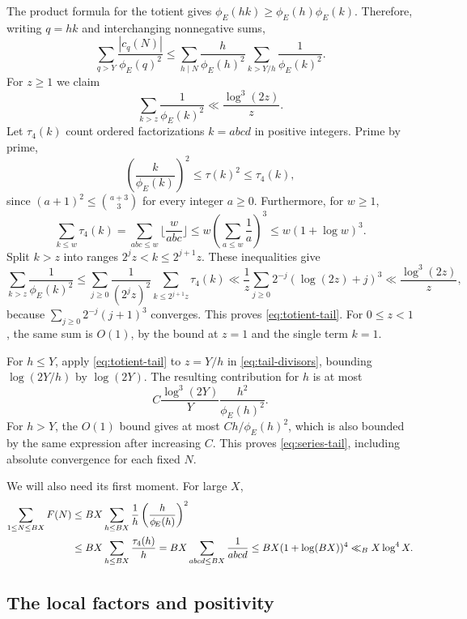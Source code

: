 \documentclass[11pt,letterpaper]{article}
\numberwithin{equation}{section}
\theoremstyle{remark}
\newcommand{\tot}{\phi_{\!E}}
\newcommand{\floor}[1]{\lfloor #1\rfloor}
\begin{document}
The product formula for the totient gives
$\tot(hk)\ge\tot(h)\tot(k)$. Therefore, writing $q=hk$ and
interchanging nonnegative sums,
\begin{equation}\label{eq:tail-divisors}
 \sum_{q>Y}\frac{|c_q(N)|}{\tot(q)^2}
 \le\sum_{h\mid N}\frac{h}{\tot(h)^2}
             \sum_{k>Y/h}\frac1{\tot(k)^2}.
\end{equation}
For $z\ge1$ we claim
\begin{equation}\label{eq:totient-tail}
 \sum_{k>z}\frac1{\tot(k)^2}\ll\frac{\log^3(2z)}z.
\end{equation}
Let $\tau_4(k)$ count ordered factorizations $k=abcd$ in positive
integers. Prime by prime,
\[
 \left(\frac{k}{\tot(k)}\right)^2\le\tau(k)^2\le\tau_4(k),
\]
since $(a+1)^2\le\binom{a+3}{3}$ for every integer $a\ge0$.
Furthermore, for $w\ge1$,
\[
 \sum_{k\le w}\tau_4(k)
 =\sum_{abc\le w}\floor{\frac{w}{abc}}
 \le w\left(\sum_{a\le w}\frac1a\right)^3
 \le w(1+\log w)^3.
\]
Split $k>z$ into ranges $2^jz<k\le2^{j+1}z$. These inequalities give
\[
 \sum_{k>z}\frac1{\tot(k)^2}
 \le\sum_{j\ge0}\frac1{(2^jz)^2}
                    \sum_{k\le2^{j+1}z}\tau_4(k)
 \ll\frac1z\sum_{j\ge0}2^{-j}(\log(2z)+j)^3
 \ll\frac{\log^3(2z)}z,
\]
because $\sum_{j\ge0}2^{-j}(j+1)^3$ converges. This proves
\eqref{eq:totient-tail}. For $0\le z<1$, the same sum is $O(1)$,
by the bound at $z=1$ and the single term $k=1$.

For $h\le Y$, apply \eqref{eq:totient-tail} to $z=Y/h$ in
\eqref{eq:tail-divisors}, bounding $\log(2Y/h)$ by $\log(2Y)$.
The resulting contribution for $h$ is at most
\[
 C\frac{\log^3(2Y)}Y\frac{h^2}{\tot(h)^2}.
\]
For $h>Y$, the $O(1)$ bound gives at most $Ch/\tot(h)^2$,
which is also bounded by the same expression after increasing $C$.
This proves \eqref{eq:series-tail}, including absolute convergence
for each fixed $N$.

We will also need its first moment. For large $X$,
\begin{align}
 \sum_{1\le N\le BX}F(N)
 &\le BX\sum_{h\le BX}\frac1h
                  \left(\frac{h}{\tot(h)}\right)^2\notag\\
 &\le BX\sum_{h\le BX}\frac{\tau_4(h)}h
 =BX\sum_{abcd\le BX}\frac1{abcd}
 \le BX(1+\log(BX))^4
 \ll_B X\log^4X.\label{eq:F-mean}
\end{align}

\subsection{The local factors and positivity}
\end{document}
